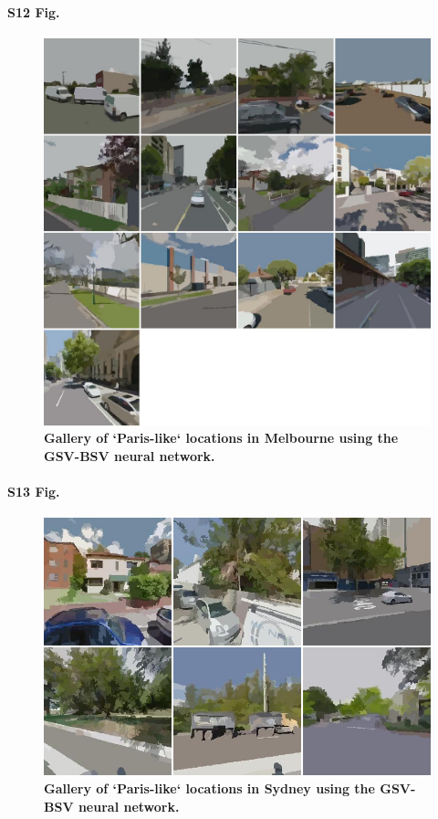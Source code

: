 \documentclass[10pt,letterpaper,hidelinks]{article}
\begin{document}
\paragraph*{S12 Fig.}
\begin{figure}[!htbp]
\centering    
\includegraphics[scale=0.35]{Images/PlosOne/Fig12.png}  
\caption{\bf Gallery of `Paris-like` locations in Melbourne using the GSV-BSV neural network.}    
 \label{fig:gsv_mel_gallery}  
\end{figure} 

\paragraph*{S13 Fig.}
\begin{figure}[!htbp]
\centering    
\includegraphics[scale=0.35]{Images/PlosOne/Fig13.png}  
\caption{\bf Gallery of `Paris-like` locations in Sydney using the GSV-BSV neural network.}    
 \label{fig:gsv_syd_gallery}  
\end{figure} 
\end{document}

